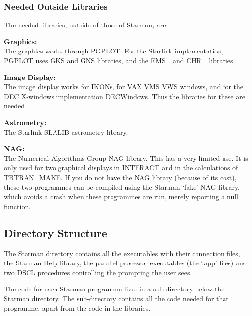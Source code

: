 \subsubsection{Needed Outside Libraries}

The needed libraries, outside of those of Starman, are:-

\begin{list}{{-}}{}

\item {\bf Graphics: \\ }
     The graphics works through PGPLOT. For the Starlink implementation, 
     PGPLOT uses GKS and GNS libraries, and the EMS\_ and CHR\_ libraries.

\item {\bf Image Display: \\ }
     The image display works for IKONs, for VAX VMS VWS windows, and for 
     the DEC X-windows implementation DECWindows. Thus the libraries for
     these are needed

\item {\bf Astrometry: \\ }
      The Starlink SLALIB astrometry library.

\item {\bf NAG: \\ }
      The Numerical Algorithms Group NAG library. This has a very limited
      use. It is only used for two graphical displays in INTERACT and
      in the calculations of TBTRAN\_MAKE. If you do not have the NAG
      library (because of its cost), these two programmes can be compiled
      using the Starman `fake' NAG library, which avoids a crash when these
      programmes are run, merely reporting a null function.

\end{list}

\subsection{Directory Structure}

The Starman directory contains all the executables with their
connection files, the Starman Help library, the parallel processor
executables (the `.app' files) and two DSCL procedures controlling the
prompting the user sees.

The code for each Starman programme lives in a sub-directory below
the Starman directory. The sub-directory contains all the code needed 
for that programme, apart from the code in the libraries.

